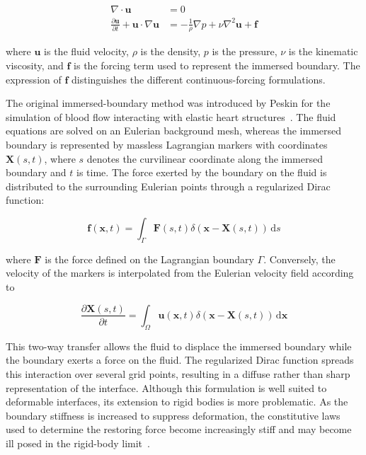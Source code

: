 \begin{subequations}\label{eq:contForcingNS}
\begin{align}
    \nabla\cdot\boldsymbol{u} &= 0
    \label{eq:contForcingContinuity}\\
    \frac{\partial\boldsymbol{u}}{\partial t}
    +\boldsymbol{u}\cdot\nabla\boldsymbol{u}
    &=
    -\frac{1}{\rho}\nabla p
    +\nu\nabla^2\boldsymbol{u}
    +\boldsymbol{f}
    \label{eq:contForcingMomentum}
\end{align}
\end{subequations}

where $\boldsymbol{u}$ is the fluid velocity, $\rho$ is the density, $p$ is the pressure, $\nu$ is the kinematic viscosity, and $\boldsymbol{f}$ is the forcing term used to represent the immersed boundary. The expression of $\boldsymbol{f}$ distinguishes the different continuous-forcing formulations.

The original immersed-boundary method was introduced by Peskin for the simulation of blood flow interacting with elastic heart structures~\cite{PESKIN1972252}. The fluid equations are solved on an Eulerian background mesh, whereas the immersed boundary is represented by massless Lagrangian markers with coordinates $\boldsymbol{X}(s,t)$, where $s$ denotes the curvilinear coordinate along the immersed boundary and $t$ is time. The force exerted by the boundary on the fluid is distributed to the surrounding Eulerian points through a regularized Dirac function:

\begin{equation}
    \boldsymbol{f}(\boldsymbol{x},t)
    =
    \int_{\Gamma}
    \boldsymbol{F}(s,t)
    \delta\!\left(\boldsymbol{x}-\boldsymbol{X}(s,t)\right)
    \,\mathrm{d}s
    \label{eq:peskinForce}
\end{equation}

where $\boldsymbol{F}$ is the force defined on the Lagrangian boundary $\Gamma$. Conversely, the velocity of the markers is interpolated from the Eulerian velocity field according to

\begin{equation}
    \frac{\partial\boldsymbol{X}(s,t)}{\partial t}
    =
    \int_{\Omega}
    \boldsymbol{u}(\boldsymbol{x},t)
    \delta\!\left(\boldsymbol{x}-\boldsymbol{X}(s,t)\right)
    \,\mathrm{d}\boldsymbol{x}
    \label{eq:peskinVelocity}
\end{equation}

This two-way transfer allows the fluid to displace the immersed boundary while the boundary exerts a force on the fluid. The regularized Dirac function spreads this interaction over several grid points, resulting in a diffuse rather than sharp representation of the interface. Although this formulation is well suited to deformable interfaces, its extension to rigid bodies is more problematic. As the boundary stiffness is increased to suppress deformation, the constitutive laws used to determine the restoring force become increasingly stiff and may become ill posed in the rigid-body limit~\cite{mittal2005immersed}.

